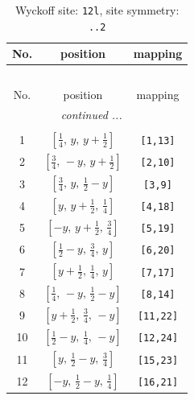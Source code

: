 \documentclass[fleqn,8pt]{jsarticle}
\begin{document}
\begin{longtable}{ccc}
\caption{Wyckoff site: {\tt 12l}, site symmetry: {\tt ..2}}
 \\
 \hline \hline
No. & position & mapping \\ \hline \endfirsthead

\multicolumn{2}{l}{\tablename\ \thetable{}} \\
 \hline \hline
No. & position & mapping \\ \hline \endhead

 \hline \hline
\multicolumn{2}{r}{\footnotesize\it continued ...} \\ \endfoot

 \hline \hline
\multicolumn{2}{r}{} \\ \endlastfoot

1 & $\left[ \frac{1}{4},\, y,\, y + \frac{1}{2} \right]$ & {\tt [1,13]} \\ \hline
2 & $\left[ \frac{3}{4},\, - y,\, y + \frac{1}{2} \right]$ & {\tt [2,10]} \\ \hline
3 & $\left[ \frac{3}{4},\, y,\, \frac{1}{2} - y \right]$ & {\tt [3,9]} \\ \hline
4 & $\left[ y,\, y + \frac{1}{2},\, \frac{1}{4} \right]$ & {\tt [4,18]} \\ \hline
5 & $\left[ - y,\, y + \frac{1}{2},\, \frac{3}{4} \right]$ & {\tt [5,19]} \\ \hline
6 & $\left[ \frac{1}{2} - y,\, \frac{3}{4},\, y \right]$ & {\tt [6,20]} \\ \hline
7 & $\left[ y + \frac{1}{2},\, \frac{1}{4},\, y \right]$ & {\tt [7,17]} \\ \hline
8 & $\left[ \frac{1}{4},\, - y,\, \frac{1}{2} - y \right]$ & {\tt [8,14]} \\ \hline
9 & $\left[ y + \frac{1}{2},\, \frac{3}{4},\, - y \right]$ & {\tt [11,22]} \\ \hline
10 & $\left[ \frac{1}{2} - y,\, \frac{1}{4},\, - y \right]$ & {\tt [12,24]} \\ \hline
11 & $\left[ y,\, \frac{1}{2} - y,\, \frac{3}{4} \right]$ & {\tt [15,23]} \\ \hline
12 & $\left[ - y,\, \frac{1}{2} - y,\, \frac{1}{4} \right]$ & {\tt [16,21]} \\
\end{longtable}
\renewcommand{\arraystretch}{1.2}
\end{document}
